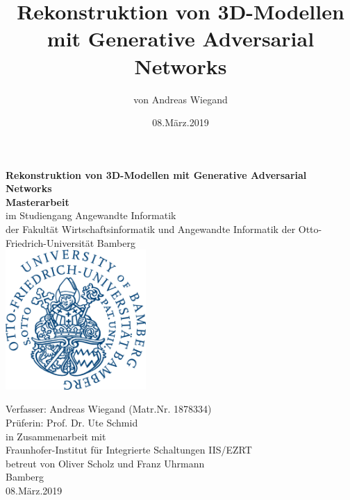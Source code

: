 \documentclass{llncs}
\begin{document}
\begin{titlepage}
	\begin{center}
		\vspace{1.0cm}		
		\textbf{\huge{Rekonstruktion von 3D-Modellen mit Generative Adversarial Networks}\\[1.0mm]}			
		\vspace{1.0cm}				
		\textbf{\large{Masterarbeit}\\[3.0mm]}
		\large{im Studiengang Angewandte Informatik \\der Fakultät Wirtschaftsinformatik und Angewandte Informatik der Otto-Friedrich-Universität Bamberg\\[8.0mm]}
		\includegraphics[width=0.4\textwidth]{bamberg_logo.png}\par\vspace{0.5cm}
		\large{Verfasser: Andreas Wiegand (Matr.Nr. 1878334)\\[5.0mm]}
		\large{Prüferin: Prof. Dr. Ute Schmid\\}
		\vspace{1.0cm}
		in Zusammenarbeit mit\\
		Fraunhofer-Institut für Integrierte Schaltungen IIS/EZRT\\
		betreut von Oliver Scholz und Franz Uhrmann\\
		\vspace{0.8cm}
		Bamberg\\
		08.März.2019
		
	\end{center}
\end{titlepage}
\renewcommand{\contentsname}{Inhaltsverzeichnis}
\tableofcontents
{}
\title{Rekonstruktion von 3D-Modellen mit Generative Adversarial Networks}
\author{von Andreas Wiegand}
\date{08.März.2019}
{\def\addcontentsline#1#2#3{}\maketitle}
\end{document}
